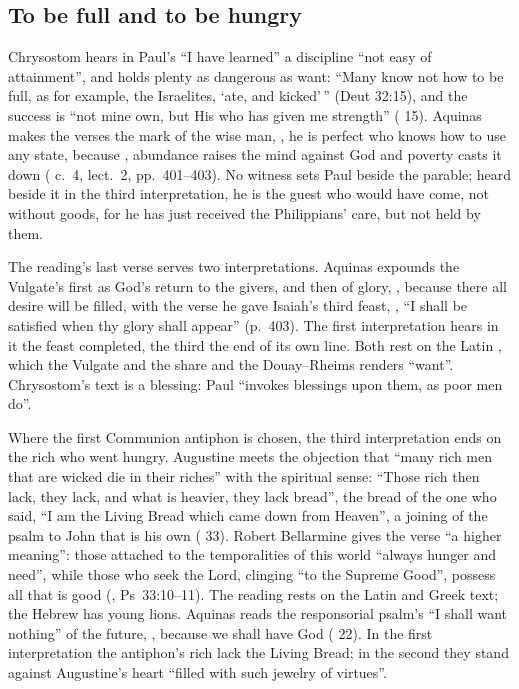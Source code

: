 \subsection{To be full and to be hungry}

Chrysostom hears in Paul's ``I have learned'' a discipline ``not easy of
attainment'', and holds plenty as dangerous as want: ``Many know not how to be
full, as for example, the Israelites, `ate, and kicked'\,'' (Deut 32:15), and
the success is ``not mine own, but His who has given me strength''
( 15). Aquinas makes the verses the
mark of the wise man, ,
he is perfect who knows how to use any state, because , abundance raises the
mind against God and poverty casts it down ( c.~4,
lect.~2, pp.~401--403). No witness sets Paul beside the parable; heard beside
it in the third interpretation, he is the guest who would have come, not
without goods, for he has just received the Philippians' care, but not held by
them.

The reading's last verse serves two interpretations. Aquinas expounds the
Vulgate's  first as God's return to the givers,
and then of glory, , because there
all desire will be filled, with the verse he gave Isaiah's third feast,
, ``I shall be satisfied when thy
glory shall appear'' (p.~403). The first interpretation hears in it the feast
completed, the third the end of its own line. Both rest on the Latin
, which the Vulgate and the  share and the
Douay--Rheims renders ``want''. Chrysostom's text is a blessing: Paul
``invokes blessings upon them, as poor men do''.

Where the first Communion antiphon is chosen, the third interpretation ends on
the rich who went hungry. Augustine meets the objection that ``many rich men
that are wicked die in their riches'' with the spiritual sense: ``Those rich
then lack, they lack, and what is heavier, they lack bread'', the bread of the
one who said, ``I am the Living Bread which came down from Heaven'', a joining
of the psalm to John that is his own ( 33).
Robert Bellarmine gives the verse ``a higher meaning'': those attached to the
temporalities of this world ``always hunger and need'', while those who seek
the Lord, clinging ``to the Supreme Good'', possess all that is good
(, Ps~33:10--11). The reading rests on
the Latin and Greek text; the Hebrew has young lions. Aquinas reads the
responsorial psalm's ``I shall want nothing'' of the future, , because we shall have God ( 22). In the first
interpretation the antiphon's rich lack the Living Bread; in the second they
stand against Augustine's heart ``filled with such jewelry of virtues''.


